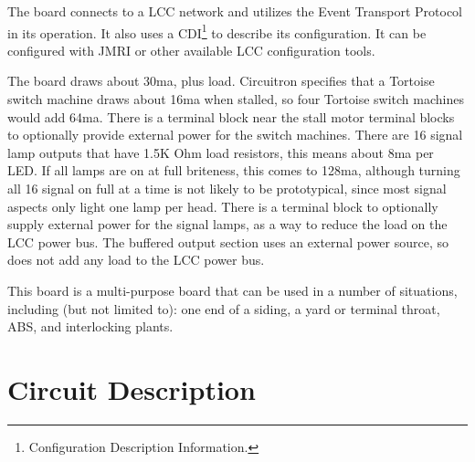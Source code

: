 The board connects to a LCC network and utilizes the Event Transport Protocol
in its operation. It also uses a CDI\footnote{Configuration Description
Information.} to describe its configuration. It can be configured with JMRI or
other available LCC configuration tools.

The board draws about 30ma, plus load. Circuitron specifies that a Tortoise
switch machine draws about 16ma when stalled, so four Tortoise switch machines
would add 64ma. There is a terminal block near the stall motor terminal blocks
to optionally provide external power for the switch machines. There are 16
signal lamp outputs that have 1.5K Ohm load resistors, this means about 8ma
per LED. If all lamps are on at full briteness, this comes to 128ma, although
turning all 16 signal on full at a time is not likely to be prototypical,
since most signal aspects only light one lamp per head. There is a terminal
block to optionally supply external power for the signal lamps, as a way to
reduce the load on the LCC power bus. The buffered output section uses an
external power source, so does not add any load to the LCC power bus.

This board is a multi-purpose board that can be used in a number of 
situations, including (but not limited to): one end of a siding, a yard or 
terminal throat, ABS, and interlocking plants.

\clearpage
\section{Circuit Description}

